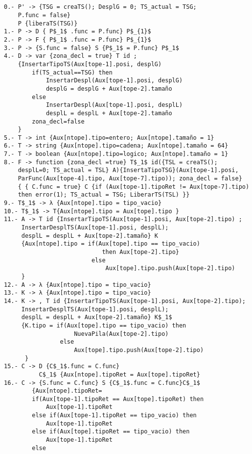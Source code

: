 \documentclass[a4paper, 12pt]{article}
\begin{document}
\begin{lstlisting}[style=EstadosAutomataST]


0.- P' -> {TSG = creaTS(); DesplG = 0; TS_actual = TSG;
    P.func = false}
    P {liberaTS(TSG)}
1.- P -> D { P$_1$ .func = P.func} P$_{1}$
2.- P -> F { P$_1$ .func = P.func} P$_{1}$
3.- P -> {S.func = false} S {P$_1$ = P.func} P$_1$
4.- D -> var {zona_decl = true} T id ;
    {InsertarTipoTS(Aux[tope-1].posi, desplG)
        if(TS_actual==TSG) then
            InsertarDespl(Aux[tope-1].posi, desplG)
            desplG = desplG + Aux[tope-2].tamaño
        else
            InsertarDespl(Aux[tope-1].posi, desplL)
            desplL = desplL + Aux[tope-2].tamaño
        zona_decl=false
    }
5.- T -> int {Aux[ntope].tipo=entero; Aux[ntope].tamaño = 1}
6.- T -> string {Aux[ntope].tipo=cadena; Aux[ntope].tamaño = 64}
7.- T -> boolean {Aux[ntope].tipo=logico; Aux[ntope].tamaño = 1}
8.- F -> function {zona_decl =true} T$_1$ id({TSL = creaTS();
    desplL=0; TS_actual = TSL} A){InsertaTipoTSG}(Aux[tope-1].posi,
    ParFunc(Aux[tope-4].tipo, Aux[tope-7].tipo)); zona_decl = false}
    { { C.func = true} C {if (Aux[tope-1].tipoRet != Aux[tope-7].tipo)
    then error(1); TS_actual = TSG; LiberarTS(TSL) }}
9.- T$_1$ -> λ {Aux[ntope].tipo = tipo_vacio}
10.- T$_1$ -> T{Aux[ntope].tipo = Aux[tope].tipo }
11.- A -> T id {InsertarTipoTS(Aux[tope-1].posi, Aux[tope-2].tipo) ;
     InsertarDesplTS(Aux[tope-1].posi, desplL);
     desplL = desplL + Aux[tope-2].tamaño} K
     {Aux[ntope].tipo = if(Aux[tope].tipo == tipo_vacio)
                            then Aux[tope-2].tipo}
                         else
                             Aux[tope].tipo.push(Aux[tope-2].tipo)
     }
12.- A -> λ {Aux[ntope].tipo = tipo_vacio}
13.- K -> λ {Aux[ntope].tipo = tipo_vacio}
14.- K -> , T id {InsertarTipoTS(Aux[tope-1].posi, Aux[tope-2].tipo);
     InsertarDesplTS(Aux[tope-1].posi, desplL);
     desplL = desplL + Aux[tope-2].tamaño} K$_1$
     {K.tipo = if(Aux[tope].tipo == tipo_vacio) then
                    NuevaPila(Aux[tope-2].tipo)
                else
                    Aux[tope].tipo.push(Aux[tope-2].tipo)
      }
15.- C -> D {C$_1$.func = C.func} 
          C$_1$ {Aux[ntope].tipoRet = Aux[tope].tipoRet}
16.- C -> {S.func = C.func} S {C$_1$.func = C.func}C$_1$
        {Aux[ntope].tipoRet=
        if(Aux[tope-1].tipoRet == Aux[tope].tipoRet) then
            Aux[tope-1].tipoRet
        else if(Aux[tope-1].tipoRet == tipo_vacio) then
            Aux[tope-1].tipoRet
        else if(Aux[tope].tipoRet == tipo_vacio) then
            Aux[tope-1].tipoRet
        else

\end{lstlisting}
\end{document}
